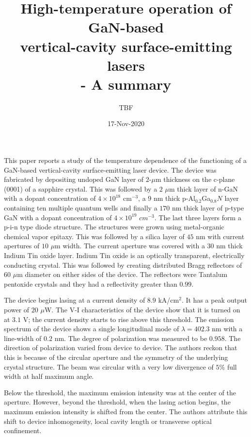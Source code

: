 \documentclass{article}
\title{High-temperature operation of GaN-based \\ vertical-cavity 
surface-emitting lasers \\ - A summary}
\date{17-Nov-2020}
\author{TBF}
\begin{document}
This paper reports a study of the temperature dependence of the functioning of
a GaN-based vertical-cavity surface-emitting laser device. 
The device was fabricated by depositing undoped GaN layer of $2$-$\mu$m
thickness on the c-plane (0001) of a sapphire crystal. This was followed by
a $2$ $\mu$m thick layer of n-GaN with a dopant concentration of $4 \times
10^{18}$ cm$^{-3}$, a $9$ nm thick p-Al$_{0.2}$Ga$_{0.8}N$ layer containing
ten multiple quantum wells and finally a $170$ nm thick layer of p-type GaN
with a dopant concentration of $4 \times 10^{19}$ $cm^{-3}$. The last three
layers form a p-i-n type diode structure. The structures were grown using 
metal-organic chemical vapor epitaxy. This was followed by a silica layer of 
$45$ nm with current apertures of $10$ $\mu$m width. The current aperture was
covered with a $30$ nm thick Indium Tin oxide layer. Indium Tin oxide is an
optically transparent, electrically conducting crystal. This was followed by
creating distributed Bragg reflectors of $60$ $\mu$m diameter on either sides
of the device. The reflectors were Tantalum pentoxide crystals and they had a 
reflectivity greater than $0.99$.

The device begins lasing at a current density of $8.9$ kA/cm${^2}$. It
has a peak output power of $20$ $\mu$W. The V-I characteristics of the
device show that it is turned on at $3.1$ V; the current density starts to
rise above this threshold. The emission spectrum of the device shows a single 
longitudinal mode of $\lambda = 402.3$ nm with a line-width of $0.2$ nm. The
degree of polarization was measured to be $0.958$. The direction of polarization
varied from device to device. The authors reckon that this is because of the
circular aperture and the symmetry of the underlying crystal structure. The 
beam was circular with a very low divergence of $5\%$ full width at half maximum angle.

Below the threshold, the maximum emission intensity was at the center
of the aperture. However, beyond the threshold, when the lasing action begins,
the maximum emission intensity is shifted from the center. The authors 
attribute this shift to device inhomogeneity, local cavity length or transverse
optical confinement.
\end{document}
